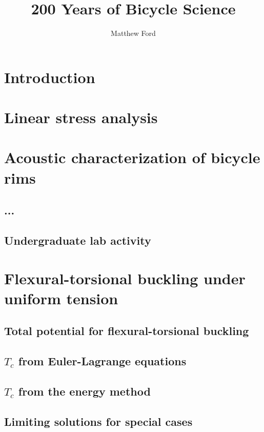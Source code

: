 \documentclass{nuthesis}
\begin{document}
\title{200 Years of Bicycle Science}
\author{Matthew Ford}

\maketitle


\tableofcontents


\chapter{Introduction}

\label{introduction}


\chapter{Linear stress analysis}



\chapter{Acoustic characterization of bicycle rims}
\section{...}
\section{Undergraduate lab activity}


\chapter{Flexural-torsional buckling under uniform tension}
\section{Total potential for flexural-torsional buckling}
\section{$T_c$ from Euler-Lagrange equations}
\section{$T_c$ from the energy method}
\section{Limiting solutions for special cases}
\end{document}
